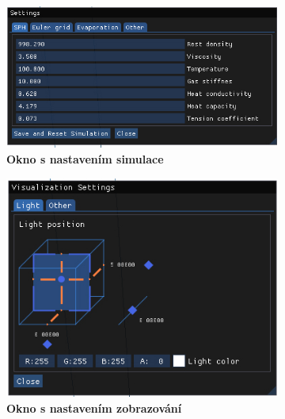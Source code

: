 \begin{figure}[h]
	\centering
	\captionsetup{justification=centering}
	\begin{subfigure}[t]{.49\textwidth}
		\centering
		\includegraphics[scale=1]{obrazky-figures/SimSett.jpg}
		\caption{\textbf{Okno s nastavením simulace}}
		\label{fig:simSett}
	\end{subfigure}
		\begin{subfigure}[t]{.49\textwidth}
		\centering
		\includegraphics[scale=1]{obrazky-figures/VisualSettings.jpg}
		\caption{\textbf{Okno s nastavením zobrazování}}
		\label{fig:VisSett}
	\end{subfigure}
		\begin{subfigure}[t]{1\textwidth}
			\centering

\end{subfigure}
\end{figure}
